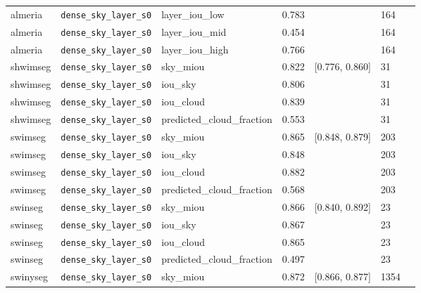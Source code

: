 \begin{center}
{\begin{tabular}{lllllll}
almeria & \texttt{dense\_\allowbreak{}sky\_\allowbreak{}layer\_\allowbreak{}s0} & layer\_iou\_low & 0.783 &  & 164 &  \\
almeria & \texttt{dense\_\allowbreak{}sky\_\allowbreak{}layer\_\allowbreak{}s0} & layer\_iou\_mid & 0.454 &  & 164 &  \\
almeria & \texttt{dense\_\allowbreak{}sky\_\allowbreak{}layer\_\allowbreak{}s0} & layer\_iou\_high & 0.766 &  & 164 &  \\
shwimseg & \texttt{dense\_\allowbreak{}sky\_\allowbreak{}layer\_\allowbreak{}s0} & sky\_miou & 0.822 & [0.776, 0.860] & 31 &  \\
shwimseg & \texttt{dense\_\allowbreak{}sky\_\allowbreak{}layer\_\allowbreak{}s0} & iou\_sky & 0.806 &  & 31 &  \\
shwimseg & \texttt{dense\_\allowbreak{}sky\_\allowbreak{}layer\_\allowbreak{}s0} & iou\_cloud & 0.839 &  & 31 &  \\
shwimseg & \texttt{dense\_\allowbreak{}sky\_\allowbreak{}layer\_\allowbreak{}s0} & predicted\_cloud\_fraction & 0.553 &  & 31 &  \\
swimseg & \texttt{dense\_\allowbreak{}sky\_\allowbreak{}layer\_\allowbreak{}s0} & sky\_miou & 0.865 & [0.848, 0.879] & 203 &  \\
swimseg & \texttt{dense\_\allowbreak{}sky\_\allowbreak{}layer\_\allowbreak{}s0} & iou\_sky & 0.848 &  & 203 &  \\
swimseg & \texttt{dense\_\allowbreak{}sky\_\allowbreak{}layer\_\allowbreak{}s0} & iou\_cloud & 0.882 &  & 203 &  \\
swimseg & \texttt{dense\_\allowbreak{}sky\_\allowbreak{}layer\_\allowbreak{}s0} & predicted\_cloud\_fraction & 0.568 &  & 203 &  \\
swinseg & \texttt{dense\_\allowbreak{}sky\_\allowbreak{}layer\_\allowbreak{}s0} & sky\_miou & 0.866 & [0.840, 0.892] & 23 &  \\
swinseg & \texttt{dense\_\allowbreak{}sky\_\allowbreak{}layer\_\allowbreak{}s0} & iou\_sky & 0.867 &  & 23 &  \\
swinseg & \texttt{dense\_\allowbreak{}sky\_\allowbreak{}layer\_\allowbreak{}s0} & iou\_cloud & 0.865 &  & 23 &  \\
swinseg & \texttt{dense\_\allowbreak{}sky\_\allowbreak{}layer\_\allowbreak{}s0} & predicted\_cloud\_fraction & 0.497 &  & 23 &  \\
swinyseg & \texttt{dense\_\allowbreak{}sky\_\allowbreak{}layer\_\allowbreak{}s0} & sky\_miou & 0.872 & [0.866, 0.877] & 1354 &  \\

\end{tabular}}
\end{center}
